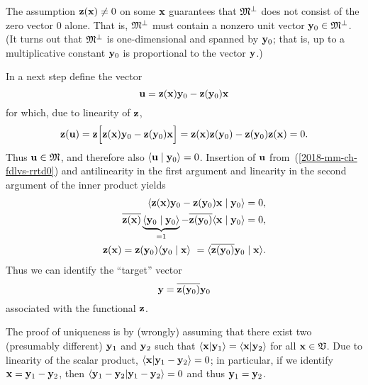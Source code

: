{The assumption ${\bf z}({\bf x}) \neq 0$  on some ${\bf x}$
guarantees that  ${\frak M}^\perp$ does not consist of the zero vector $0$ alone.
That is, ${\frak M}^\perp$ must contain a nonzero unit vector ${\bf y}_0\in {\frak M}^\perp$.
(It turns out that ${\frak M}^\perp$  is one-dimensional and spanned by ${\bf y}_0$;
that is, up to a multiplicative constant ${\bf y}_0$ is proportional to the vector ${\bf y}$.)

In a next step define the vector
\begin{equation}
 {\bf u} = {\bf z}({\bf x}) {\bf y}_0 - {\bf z}({\bf y}_0) {\bf x}
\label{2018-mm-ch-fdlvs-rrtd0}
\end{equation}
for which, due to linearity of ${\bf z}$,
\begin{equation}
 {\bf z}({\bf u}) = {\bf z}\Big[{\bf z}({\bf x}) {\bf y}_0 - {\bf z}({\bf y}_0)   {\bf x}\Big]
= {\bf z}({\bf x}) {\bf z}({\bf y}_0) - {\bf z}({\bf y}_0) {\bf z}({\bf x})
=0
.
\label{2018-mm-ch-fdlvs-rrtd1}
\end{equation}
Thus ${\bf u} \in {\frak M}$, and therefore also $\langle {\bf u} \mid {\bf y}_0 \rangle =0$.
Insertion of ${\bf u}$ from~(\ref{2018-mm-ch-fdlvs-rrtd0})
and antilinearity in the first argument and linearity in the second argument  of the inner product yields
\begin{equation}
\begin{split}
 \langle {\bf z}({\bf x}) {\bf y}_0  - {\bf z}({\bf y}_0) {\bf x} \mid  {\bf y}_0 \rangle=0,\\
\overline{{\bf z}({\bf x})} \underbrace{\langle {\bf y}_0 \mid  {\bf y}_0 \rangle}_{=1}
               - \overline{{\bf z}({\bf y}_0)} \langle {\bf x} \mid  {\bf y}_0 \rangle=0,\\
{\bf z}({\bf x}) = {\bf z}({\bf y}_0) \langle    {\bf y}_0\mid  {\bf x}\rangle\
=  \langle   \overline{{\bf z}({\bf y}_0)} {\bf y}_0\mid  {\bf x}\rangle
.
\end{split}
\label{2018-mm-ch-fdlvs-rrtd2}
\end{equation}
Thus we can identify the ``target'' vector
\begin{equation}
{\bf y} =  \overline{{\bf z}({\bf y}_0)} {\bf y}_0
\label{2018-mm-ch-fdlvs-rrtdtv}
\end{equation}
associated with the functional ${\bf z}$.

The proof of uniqueness is by (wrongly) assuming
that there exist two (presumably different) ${\bf y}_1$ and ${\bf y}_2$
such that
$
\langle {\bf x} \vert {\bf y}_1 \rangle
=
\langle {\bf x} \vert {\bf y}_2 \rangle
$ for all ${\bf x} \in {\frak V}$.
Due to linearity of the scalar product,
$
\langle  {\bf x}\vert {\bf y}_1-{\bf y}_2\rangle =0
$;
in particular, if we identify
${\bf x}={\bf y}_1-{\bf y}_2$,
then
$
\langle {\bf y}_1-{\bf y}_2 \vert {\bf y}_1-{\bf y}_2\rangle =0
$
and thus ${\bf y}_1={\bf y}_2$.

}
